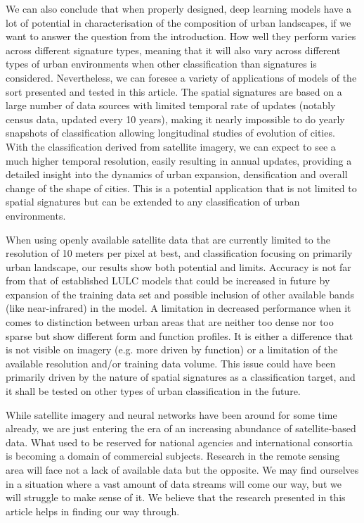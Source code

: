 We can also conclude that when properly designed, deep learning models have a lot of potential
in characterisation of the composition of urban landscapes, if we want to answer the question
from the introduction. How well they perform varies across different signature types, meaning that
it will also vary across different types of urban environments when other classification than
signatures is considered. Nevertheless, we can foresee a variety of applications of
models of the sort presented and tested in this article. The spatial signatures are based on
a large number of data sources with limited temporal rate of updates (notably census data, updated every 10 years), making it nearly impossible to do yearly snapshots
of classification allowing longitudinal studies of evolution of cities. With the classification
derived from satellite imagery, we can expect to see a much higher temporal resolution,
easily resulting in annual updates, providing a detailed insight into the dynamics of urban
expansion, densification and overall change of the shape of cities. This is a potential
application that is not limited to spatial signatures but can be extended to any
classification of urban environments.

When using openly available satellite data that are currently limited to the resolution
of 10 meters per pixel at best, and classification focusing on primarily urban landscape,
our results show both potential and limits. Accuracy is not far from
that of established LULC models that could be increased in future by expansion of the training
data set and possible inclusion of other available bands (like near-infrared) in the model.
A limitation in decreased performance when it comes to distinction between urban areas that
are neither too dense nor too sparse but show different form and function profiles. It is
either a difference that is not visible on imagery (e.g. more driven by function) or a
limitation of the available resolution and/or training data volume. This issue could have
been primarily driven by the nature of spatial signatures as a classification target, and
it shall be tested on other types of urban classification in the future.

While satellite imagery and neural networks have been around for some time already, we
are just entering the era of an increasing abundance of satellite-based data. What used
to be reserved for national agencies and international consortia is becoming a domain of
commercial subjects. Research in the remote sensing area will face not a lack of
available data but the opposite. We may find ourselves in a situation where a vast
amount of data streams will come our way, but we will struggle to make sense of it. We
believe that the research presented in this article helps in finding our way through.
